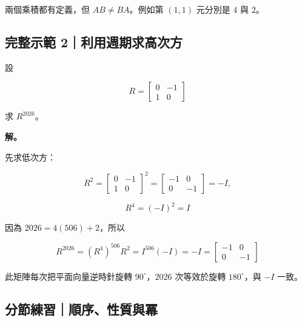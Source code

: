 \documentclass[11pt,a4paper]{article}
\begin{document}
兩個乘積都有定義，但 \(AB\ne BA\)。例如第 \((1,1)\) 元分別是 \(4\) 與 \(2\)。

\subsection{完整示範 2｜利用週期求高次方}\label{ux5b8cux6574ux793aux7bc4-2ux5229ux7528ux9031ux671fux6c42ux9ad8ux6b21ux65b9}

設

\[
R=\begin{bmatrix}0&-1\\1&0\end{bmatrix}
\]

求 \(R^{2026}\)。

\textbf{解。}

先求低次方：

\[
R^2=
\begin{bmatrix}0&-1\\1&0\end{bmatrix}^2
=\begin{bmatrix}-1&0\\0&-1\end{bmatrix}
=-I,
\]

\[
R^4=(-I)^2=I
\]

因為 \(2026=4(506)+2\)，所以

\[
R^{2026}=(R^4)^{506}R^2=I^{506}(-I)=-I
=\begin{bmatrix}-1&0\\0&-1\end{bmatrix}
\]

此矩陣每次把平面向量逆時針旋轉 \(90^\circ\)，\(2026\) 次等效於旋轉 \(180^\circ\)，與 \(-I\) 一致。

\subsection{分節練習｜順序、性質與冪}\label{ux5206ux7bc0ux7df4ux7fd2ux9806ux5e8fux6027ux8ceaux8207ux51aa}
\end{document}
